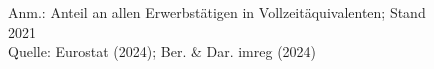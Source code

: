 \begin{figure}[p]
	{\centering {}}
	\label{map:forscherstaat}
	\begin{spacing}{1} \scriptsize
		Anm.: Anteil an allen Erwerbstätigen in Vollzeitäquivalenten; Stand 2021\\
		Quelle: Eurostat (2024); Ber. \& Dar. imreg (2024) \end{spacing}
\end{figure}